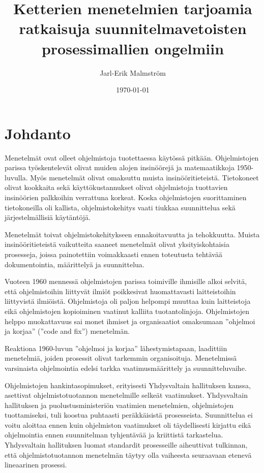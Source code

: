 \documentclass[finnish]{tktltiki2}
\title{Ketterien menetelmien tarjoamia ratkaisuja suunnitelmavetoisten prosessimallien ongelmiin}
\author{Jarl-Erik Malmström}
\date{\today}
\theoremstyle{definition}
\theoremstyle{remark}
\begin{document}

\maketitle        %
\makeabstract     %

\tableofcontents  %
\newpage          %



\section{Johdanto}
 
Menetelmät ovat olleet ohjelmistoja tuotettaessa käytössä pitkään. Ohjelmistojen parissa työskentelevät olivat muiden alojen insinöörejä ja matemaatikkoja 1950-luvulla. Myös menetelmät olivat omaksuttu muista insinööritieteistä. Tietokoneet olivat kookkaita sekä käyttökustannukset olivat ohjelmistoja tuottavien insinöörien palkkoihin verrattuna korkeat. Koska ohjelmistojen suorittaminen tietokoneilla oli kallista, ohjelmistokehitys vaati tiukkaa suunnittelua sekä järjestelmällisiä käytäntöjä\cite{BOE06}.   

Menetelmät toivat ohjelmistokehitykseen ennakoitavuutta ja tehokkuutta. Muista insinööritieteistä vaikutteita saaneet menetelmät olivat yksityiskohtaisia prosesseja, joissa painotettiin voimakkaasti ennen toteutusta tehtävää dokumentointia, määrittelyä ja suunnittelua\cite{FOW01a}.

Vuoteen 1960 mennessä ohjelmistojen parissa toimiville ihmisille alkoi selvitä, että ohjelmistoihin liittyvät ilmiöt poikkesivat huomattavasti laitteistoihin liittyvistä ilmiöistä. Ohjelmistoja oli paljon helpompi muuttaa kuin laitteistoja eikä ohjelmistojen kopioiminen vaatinut kalliita tuotantolinjoja. Ohjelmistojen helppo muokattavuus sai monet ihmiset ja organisaatiot omaksumaan ''ohjelmoi ja korjaa'' (''code and fix'') menetelmän\cite{BOE06}.

Reaktiona 1960-luvun ''ohjelmoi ja korjaa'' lähestymistapaan, laadittiin menetelmiä, joiden prosessit olivat tarkemmin organisoituja. Menetelmissä varsinaista ohjelmointia edelsi tarkka vaatimusmäärittely ja suunnitteluvaihe\cite{BOE06}.

Ohjelmistojen hankintasopimukset, erityisesti Yhdysvaltain hallituksen kanssa, asettivat ohjelmistotuotannon menetelmille selkeät vaatimukset. Yhdysvaltain hallituksen ja puolustusministeriön vaatimien menetelmien, ohjelmistojen tuottamiseksi, tuli koostua puhtaasti peräkkäisistä prosesseista. Suunnittelua ei voitu aloittaa ennen kuin ohjelmiston vaatimukset oli täydellisesti kirjattu eikä ohjelmointia ennen suunnitelman tyhjentävää ja kriittistä tarkastelua. Yhdysvaltain hallituksen luomat standardit prosesseille aiheuttivat tulkinnan, että ohjelmistotuotannon menetelmän täytyy olla vaiheesta seuraavaan etenevä lineaarinen prosessi\cite{BOE06}.
\end{document}
